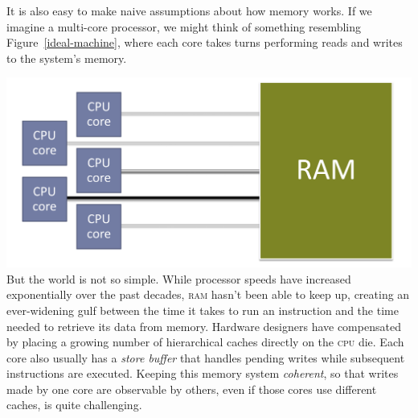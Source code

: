 \documentclass[fontsize=10pt, oneside]{scrartcl}
\newcommand{\fig}[1]{Figure~\ref{#1}}
\newcommand{\introduce}[1]{\textit{#1}}
\newenvironment{colfigure}
  {\par\vspace{1\baselineskip minus 0.5\baselineskip}\noindent\minipage{\linewidth}}
  {\endminipage\vspace{1\baselineskip minus 0.7\baselineskip}}
\begin{document}
It is also easy to make naive assumptions about how memory works.
If we imagine a multi-core processor, we might think of something resembling \fig{ideal-machine},
where each core takes turns performing reads and writes to the system's memory.
\begin{colfigure}
\centering
\includegraphics[keepaspectratio, width=0.8\linewidth]{ideal-machine}
\label{ideal-machine}
\end{colfigure}
But the world is not so simple.
While processor speeds have increased exponentially over the past decades,
\textsc{ram} hasn't been able to keep up,
creating an ever-widening gulf between the time it takes to run an
instruction and the time needed to retrieve its data from memory.
Hardware designers have compensated by placing a growing number of
hierarchical caches directly on the \textsc{cpu} die.
Each core also usually has a \introduce{store buffer} that handles
pending writes while subsequent instructions are executed.
Keeping this memory system \introduce{coherent},
so that writes made by one core are observable by others,
even if those cores use different caches, is quite challenging.
\end{document}
